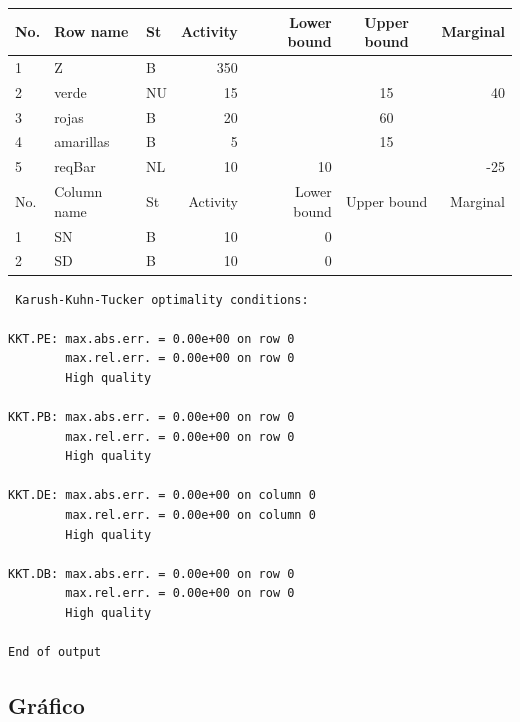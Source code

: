 \documentclass[a4paper,10pt]{article}
\begin{document}
\begin{center}
 
 \begin{tabular}{| l  l  l  r  r  c  r |}
  
    \hline
    No. &  	Row  name    &    St 	&     Activity &       Lower bound 	&     Upper bound	&      Marginal 	\\ \hline
    \hline
     1 	&	Z            &	B	&      350	&		    	&			&		\\                             
     2 	&	verde        &	NU      &	15	&                   	&       	15      & 	40	\\
     3 	&	rojas        &  B	&       20	&                   	&       	60 	&		\\
     4 	&	amarillas    &  B      &        5      &                   	& 		15 	&		\\
     5 	&	reqBar       &  NL     &       10      &      10           	&              	 	&	-25	\\ \hline
      \hline
    No.	& 	Column  name &    St 	&     Activity 	&       Lower bound 	&     Upper bound 	&      Marginal 	\\ \hline
    \hline
     1 &	SN           &	B	& 	10	&             0         &			&		\\      
     2 &	SD           &	B       &      10      &	      0          &			&		\\     
     \hline
 \end{tabular}
\end{center}

\begin{verbatim}
 Karush-Kuhn-Tucker optimality conditions:

KKT.PE: max.abs.err. = 0.00e+00 on row 0
        max.rel.err. = 0.00e+00 on row 0
        High quality

KKT.PB: max.abs.err. = 0.00e+00 on row 0
        max.rel.err. = 0.00e+00 on row 0
        High quality

KKT.DE: max.abs.err. = 0.00e+00 on column 0
        max.rel.err. = 0.00e+00 on column 0
        High quality

KKT.DB: max.abs.err. = 0.00e+00 on row 0
        max.rel.err. = 0.00e+00 on row 0
        High quality

End of output

\end{verbatim}

\subsection{Gr\'afico}
\end{document}
